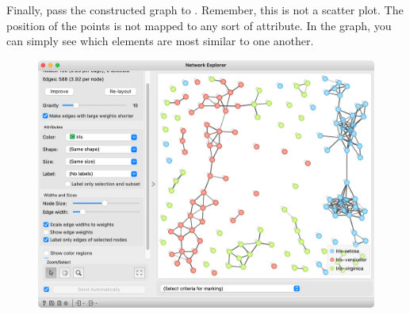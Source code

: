 \newpage

Finally, pass the constructed graph to . Remember, this is not a scatter plot. The position of the points is not mapped to any sort of attribute. In the graph, you can simply see which elements are most similar to one another.

\begin{figure}[h]
    \centering
    \includegraphics[width=\linewidth]{network-explorer.png}
    \caption{$\;$}
\end{figure}
